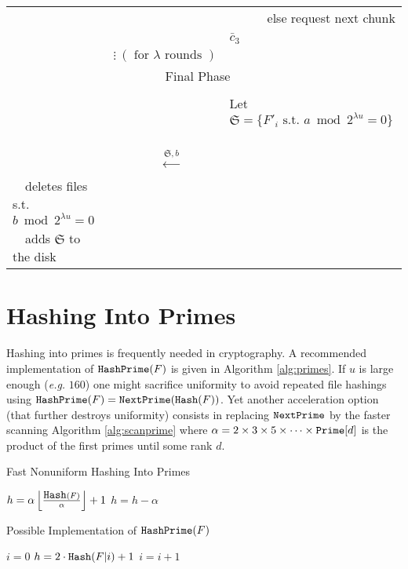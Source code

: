 \documentclass[11pt]{llncs}
\begin{document}
\begin{center}
\begin{tabular}{|lcl|}
                                   &                                                      &~~~~~~else request next chunk $\bar{c}_3$~~\\
                                   &                  $\vdots~(\mbox{~for~}\lambda \mbox{~rounds~})$    & \\\hline\hline
\multicolumn{3}{|c|}{{\sf Final Phase~~}} \\\hline
                                   &                                                      & \\
                                   &                                                      &Let $\mathfrak{S}=\{F'_i \mbox{~s.t.~} a \bmod 2^{\lambda u} =0\}$~~\\
                                   &~~{\LARGE $\stackrel{\mathfrak{S},b}{\longleftarrow}$}&\\
                                   ~~deletes files s.t. $b \bmod 2^{\lambda u} =0$&        &\\
                                   ~~adds $\mathfrak{S}$ to the disk    &                                                      &\\\hline
\end{tabular}
\end{center}

\section{Hashing Into Primes}

Hashing into primes is frequently needed in cryptography. A recommended implementation of $\mbox{{\tt HashPrime}}(F)$ is given in Algorithm \ref{alg:primes}. If $u$ is large enough ({\sl e.g.} $160$) one might sacrifice uniformity to avoid repeated file hashings using $\mbox{{\tt HashPrime}}(F)=\mbox{{\tt NextPrime}}(\mbox{{\tt Hash}}(F))$. Yet another acceleration option (that further destroys uniformity) consists in replacing $\mbox{{\tt NextPrime}}$ by the faster scanning Algorithm \ref{alg:scanprime} where $\alpha=2\times 3\times 5\times \cdots \times \mbox{{\tt Prime}}[d]$ is the product of the first primes until some rank $d$.

\begin{algorithm}
  \caption{Fast Nonuniform Hashing Into Primes}
  \label{alg:scanprime}
  \begin{algorithmic}[1]
  \State $h =\alpha \left\lfloor\frac{\mbox{{\tt Hash}}(F)}{\alpha}\right\rfloor+1$
\State $h = h-\alpha$
\EndWhile
\State {}
  \end{algorithmic}
\end{algorithm}

\begin{algorithm}
  \caption{Possible Implementation of $\mbox{{\tt HashPrime}}(F)$}
  \label{alg:primes}
  \begin{algorithmic}[1]
  \State $i=0$
\Repeat
\State $h = 2\cdot\mbox{{\tt Hash}}(F|i)+1$
\State $i = i+1$
\State {}
  \end{algorithmic}
\end{algorithm}
\end{document}
